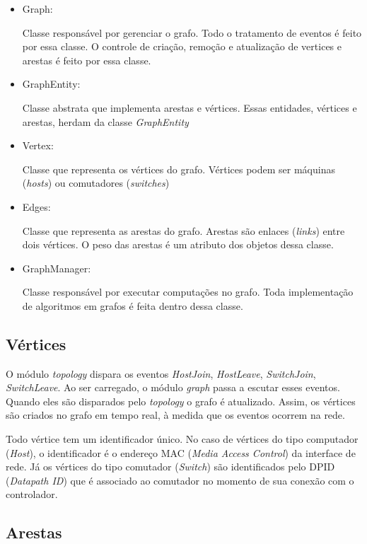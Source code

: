 \begin{itemize}
    \item{Graph}: 
        
        Classe responsável por gerenciar o grafo.
        Todo o tratamento de eventos é feito por essa classe.
        O controle de criação, remoção e atualização de vertices e arestas 
        é feito por essa classe.
    \item{GraphEntity}: 
        
        Classe abstrata que implementa arestas e vértices.
        Essas entidades, vértices e arestas, herdam da classe 
        \emph{GraphEntity}
    \item{Vertex}: 
        
        Classe que representa os vértices do grafo.
        Vértices podem ser máquinas (\emph{hosts}) ou comutadores
        (\emph{switches})
    \item{Edges}: 
        
        Classe que representa as arestas do grafo.
        Arestas são enlaces (\emph{links}) entre dois vértices.
        O peso das arestas é um atributo dos objetos dessa classe.
    \item{GraphManager}: 
        
        Classe responsável por executar computações no grafo.
        Toda implementação de algoritmos em grafos é feita dentro dessa classe.
\end{itemize}

\subsection{Vértices}

O módulo \emph{topology} dispara os eventos \emph{HostJoin}, \emph{HostLeave},
\emph{SwitchJoin}, \emph{SwitchLeave}.
Ao ser carregado, o módulo \emph{graph} passa a escutar esses eventos.
Quando eles são disparados pelo \emph{topology} o grafo é atualizado.
Assim, os vértices são criados no grafo em tempo real, à medida que os
eventos ocorrem na rede.

Todo vértice tem um identificador único.
No caso de vértices do tipo computador (\emph{Host}), o identificador 
é o endereço MAC (\emph{Media Access Control}) da interface de rede.
Já os vértices do tipo comutador (\emph{Switch}) são identificados pelo 
DPID (\emph{Datapath ID}) que é associado ao comutador no momento de sua 
conexão com o controlador.

\subsection{Arestas}

